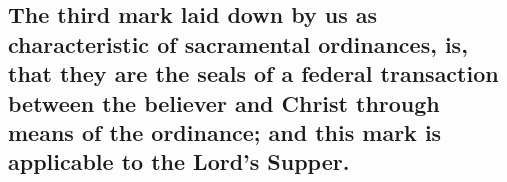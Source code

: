 \documentclass[]{book}
\begin{document}
\hypertarget{the-third-mark-laid-down-by-us-as-characteristic-of-sacramental-ordinances-is-that-they-are-the-seals-of-a-federal-transaction-between-the-believer-and-christ-through-means-of-the-ordinance-and-this-mark-is-applicable-to-the-lords-supper.}{%
\subsection{The third mark laid down by us as characteristic of sacramental ordinances, is, that they are the seals of a federal transaction between the believer and Christ through means of the ordinance; and this mark is applicable to the Lord's Supper.}\label{the-third-mark-laid-down-by-us-as-characteristic-of-sacramental-ordinances-is-that-they-are-the-seals-of-a-federal-transaction-between-the-believer-and-christ-through-means-of-the-ordinance-and-this-mark-is-applicable-to-the-lords-supper.}}
\end{document}
